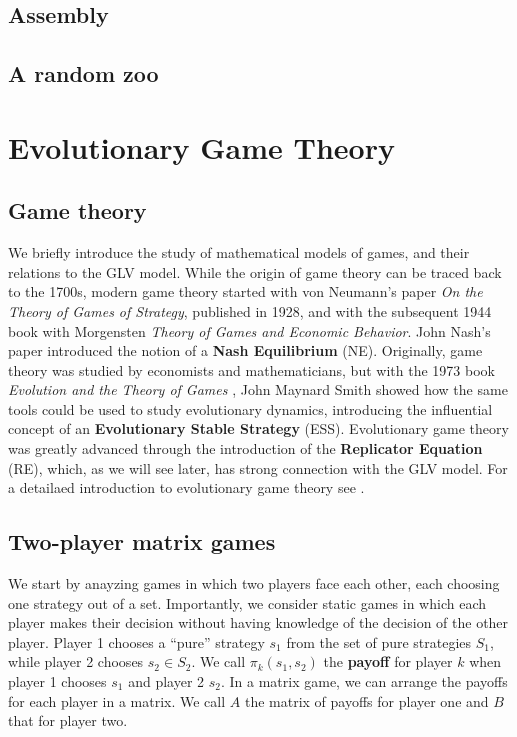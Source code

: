 \documentclass[]{book}
\begin{document}
\hypertarget{assembly}{%
\section{Assembly}\label{assembly}}

\hypertarget{a-random-zoo}{%
\section{A random zoo}\label{a-random-zoo}}

\hypertarget{games}{%
\chapter{Evolutionary Game Theory}\label{games}}

\hypertarget{game-theory}{%
\section{Game theory}\label{game-theory}}

We briefly introduce the study of mathematical models of games, and their relations to the GLV model. While the origin of game theory can be traced back to the 1700s, modern game theory started with von Neumann's paper \emph{On the Theory of Games of Strategy}, published in 1928, and with the subsequent 1944 book with Morgensten \emph{Theory of Games and Economic Behavior}. John Nash's paper \citep{nash1950equilibrium} introduced the notion of a \textbf{Nash Equilibrium} (NE). Originally, game theory was studied by economists and mathematicians, but with the 1973 book \emph{Evolution and the Theory of Games} \citep{smith1982evolution}, John Maynard Smith showed how the same tools could be used to study evolutionary dynamics, introducing the influential concept of an \textbf{Evolutionary Stable Strategy} (ESS). Evolutionary game theory was greatly advanced through the introduction of the \textbf{Replicator Equation} (RE), which, as we will see later, has strong connection with the GLV model. For a detailaed introduction to evolutionary game theory see \citet{hofbauer1998evolutionary}.

\hypertarget{two-player-matrix-games}{%
\section{Two-player matrix games}\label{two-player-matrix-games}}

We start by anayzing games in which two players face each other, each choosing one strategy out of a set. Importantly, we consider static games in which each player makes their decision without having knowledge of the decision of the other player. Player 1 chooses a ``pure'' strategy \(s_1\) from the set of pure strategies \(S_1\), while player 2 chooses \(s_2 \in S_2\). We call \(\pi_k (s_1, s_2)\) the \textbf{payoff} for player \(k\) when player 1 chooses \(s_1\) and player 2 \(s_2\). In a matrix game, we can arrange the payoffs for each player in a matrix. We call \(A\) the matrix of payoffs for player one and \(B\) that for player two.
\end{document}
